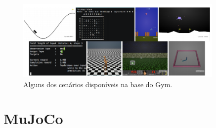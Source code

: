 \documentclass[cic,tc]{iiufrgs}
\begin{document}
%









\begin{figure}[h]
    \caption{Alguns dos cenários disponíveis na base do Gym.}
    \begin{center}
      \includegraphics[width=0.9\textwidth]{environments.png}
    \end{center}
    \label{fig:gymenvironments}
\end{figure}


\section{MuJoCo}
\end{document}
